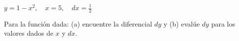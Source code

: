 \setcounter{enumi}{8}
\item $\displaystyle y = 1 - x^2, \quad x = 5, \quad dx = \frac{1}{2}$
\par
Para la función dada: (a) encuentre la diferencial $dy$ y (b) evalúe $dy$ para los valores dados de $x$ y $dx$.
